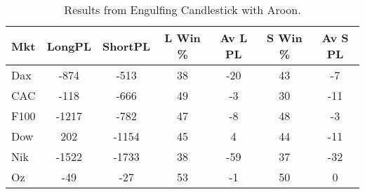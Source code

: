 \begin{table}[ht]
\centering
\caption[Engulfing Candlestick System with Aroon]{Results from Engulfing Candlestick with Aroon.} 
\label{tab:engulf_aroon_results}
\begin{tabular}{lcccccc}
  \toprule Mkt & LongPL & ShortPL & L Win \% & Av L PL & S Win \% & Av S PL \\ 
  \midrule Dax & -874 & -513 & 38 & -20 & 43 & -7 \\ 
  CAC & -118 & -666 & 49 & -3 & 30 & -11 \\ 
  F100 & -1217 & -782 & 47 & -8 & 48 & -3 \\ 
  Dow & 202 & -1154 & 45 & 4 & 44 & -11 \\ 
  Nik & -1522 & -1733 & 38 & -59 & 37 & -32 \\ 
  Oz & -49 & -27 & 53 & -1 & 50 & 0 \\ 
   \bottomrule \end{tabular}
\end{table}
